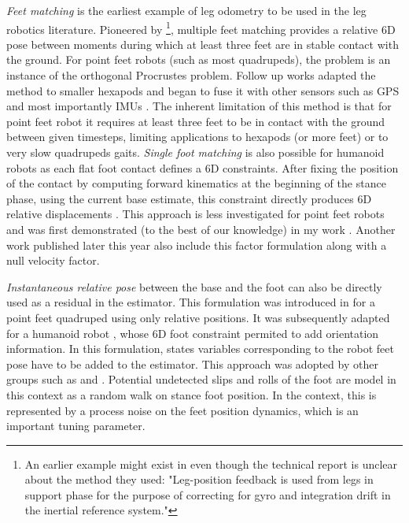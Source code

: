 \textit{Feet matching} is the earliest example of leg odometry to be used in the leg robotics literature. Pioneered by \cite{roston1991dead} 
\footnote{An earlier example might exist in \cite{waldron1986adaptive} even though the technical report is unclear about the method they used: 
"Leg-position feedback is used from legs in support phase for the purpose of correcting for gyro and integration drift in the inertial reference system."},
multiple feet matching provides a relative 6D pose between moments during which at least three feet are in stable contact with the ground.
For point feet robots (such as most quadrupeds), the problem is an instance of the orthogonal Procrustes problem.
Follow up works adapted the method to smaller hexapods \cite{lin2005leg} and began to fuse it with other sensors such as GPS \cite{gassmann2005localization, cobano2008location} 
and most importantly IMUs \cite{lin2006sensor, reinstein2011dead}.
The inherent limitation of this method is that for point feet robot it requires at least three feet to be in contact with the ground between given timesteps, limiting
applications to hexapods (or more feet) or to very slow quadrupeds gaits.
\textit{Single foot matching} is also possible for humanoid robots as each flat foot contact defines a 6D constraints. After fixing the position of the contact 
by computing forward kinematics at the beginning of the stance phase, using the current base estimate, this constraint directly produces 6D 
relative displacements \cite{flayols2017experimental,xinjilefu2014decoupled,johnson2015team}. This approach is less investigated for point feet robots and was first 
demonstrated (to the best of our knowledge) in my work \cite{fourmy2021contact}. Another work published later this year \cite{kim2021legged} also include this 
factor formulation along with a null velocity factor. 

\textit{Instantaneous relative pose} between the base and the foot can also be directly used as a residual in the estimator. This formulation
was introduced in \cite{bloesch2013state, bloesch2013stateSlippery} for a point feet quadruped using only relative positions. It was subsequently 
adapted for a humanoid robot \cite{rotella2014state}, whose 6D foot constraint permited to add orientation information. In this formulation, 
states variables corresponding to the robot feet pose have to 
be added to the estimator. This approach was adopted by other groups such as \cite{hartley2018legged, hartley2018hybrid, hartley2020contact} and \cite{bledt2018cheetah}.
Potential undetected slips and rolls of the foot are model in this context as a random walk on stance foot position. In the \KalmanF context, this is represented
by a process noise on the feet position dynamics, which is an important tuning parameter.

